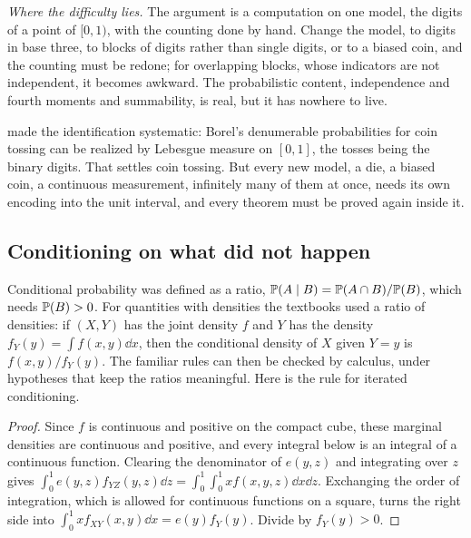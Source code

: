 \begin{refsection}
\begin{aside}
\emph{Where the difficulty lies.} The argument is a computation on one model, the digits of a point of $[0,1)$, with the counting done by hand. Change the model, to digits in base three, to blocks of digits rather than single digits, or to a biased coin, and the counting must be redone; for overlapping blocks, whose indicators are not independent, it becomes awkward. The probabilistic content, independence and fourth moments and summability, is real, but it has nowhere to live.
\end{aside}

\textcite{Steinhaus1923} made the identification systematic: Borel's denumerable probabilities for coin tossing can be realized by Lebesgue measure on $[0,1]$, the tosses being the binary digits. That settles coin tossing. But every new model, a die, a biased coin, a continuous measurement, infinitely many of them at once, needs its own encoding into the unit interval, and every theorem must be proved again inside it.

\subsection{Conditioning on what did not happen}\label{sec:kolmogorov:conditioning}

Conditional probability was defined as a ratio, $\mathbb{P}(A\mid B)=\mathbb{P}(A\cap B)/\mathbb{P}(B)$, which needs $\mathbb{P}(B)>0$. For quantities with densities the textbooks used a ratio of densities: if $(X,Y)$ has the joint density $f$ and $Y$ has the density $f_Y(y)=\int f(x,y)\dd x$, then the conditional density of $X$ given $Y=y$ is $f(x,y)/f_Y(y)$. The familiar rules can then be checked by calculus, under hypotheses that keep the ratios meaningful. Here is the rule for iterated conditioning.


\begin{proof}
Since $f$ is continuous and positive on the compact cube, these marginal densities are continuous and positive, and every integral below is an integral of a continuous function. Clearing the denominator of $e(y,z)$ and integrating over $z$ gives $\int_0^1e(y,z)f_{YZ}(y,z)\dd z=\int_0^1\!\int_0^1xf(x,y,z)\dd x\dd z$. Exchanging the order of integration, which is allowed for continuous functions on a square, turns the right side into $\int_0^1xf_{XY}(x,y)\dd x=e(y)f_Y(y)$. Divide by $f_Y(y)>0$.
\end{proof}


\end{refsection}
